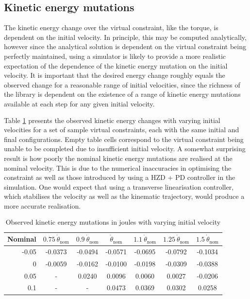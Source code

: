 \subsection{Kinetic energy mutations} \label{sec:reskineng}
The kinetic energy change over the virtual constraint, like the torque, is dependent on the initial velocity. In principle, this may be computed analytically, however since the analytical solution is dependent on the virtual constraint being perfectly maintained, using a simulator is likely to provide a more realistic expectation of the dependence of the kinetic energy mutation on the initial velocity. It is important that the desired energy change roughly equals the observed change for a reasonable range of initial velocities, since the richness of the library is dependent on the existence of a range of kinetic energy mutations available at each step for any given initial velocity.

Table \ref{tab:vcenergy} presents the observed kinetic energy changes with varying initial velocities for a set of sample virtual constraints, each with the same initial and final configurations. Empty table cells correspond to the virtual constraint being unable to be completed due to insufficient initial velocity. A somewhat surprising result is how poorly the nominal kinetic energy mutations are realised at the nominal velocity. This is due to the numerical inaccuracies in optimising the constraint as well as those introduced by using a HZD + PD controller in the simulation. One would expect that using a transverse linearisation controller, which stabilises the velocity as well as the kinematic trajectory, would produce a more accurate realisation. 

\begin{table}
	\centering
	\begin{tabular}{ r || c | c | c | c | c | c}
		Nominal & $0.75~\dot{\theta}_{\mathrm{nom}}$ & $0.9~\dot{\theta}_{\mathrm{nom}}$ & $\dot{\theta}_{\mathrm{nom}}$ & $1.1~\dot{\theta}_{\mathrm{nom}}$ & $1.25~\dot{\theta}_{\mathrm{nom}}$ & $1.5~\dot{\theta}_{\mathrm{nom}}$ \\ \hline
		-0.05 & -0.0373 & -0.0494 & -0.0571 & -0.0695 & -0.0792 & -0.1034  \\
		0     & -0.0059 & -0.0162 & -0.0100 & -0.0198 & -0.0309 & -0.0388 \\
		0.05  &    -    &  0.0240 &  0.0096 &  0.0060 &  0.0027 & -0.0206  \\
		0.1   &    -    &    -    &  0.0473 &  0.0369 &  0.0302 &  0.0258
	\end{tabular}
	\caption[Observed kinetic energy mutations with varying initial velocity]{Observed kinetic energy mutations in joules with varying initial velocity}
	\label{tab:vcenergy}
\end{table}

